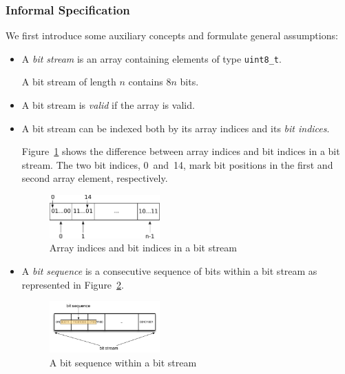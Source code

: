 \subsubsection{Informal Specification}
\label{informal-peek}


We first introduce some auxiliary concepts and formulate general assumptions:

\begin{itemize}
\item
A \emph{bit stream} is an array containing elements of type \verb"uint8_t".

A bit stream of length $n$ contains $8n$ bits.

\item
A bit stream is \emph{valid} if the array is valid.

\item 
A bit stream can be indexed both by its array indices
and its \emph{bit indices}.

Figure~\ref{fig:bitstream-indices} shows the difference between 
array indices and bit indices in a bit stream.
The two bit indices, 0~and~14,
mark bit positions in the first and second array element, respectively.

\begin{figure}[hbt]
\begin{center}
\includegraphics[width=0.40\textwidth]{figures/array_as_stream.pdf}
\caption{\label{fig:bitstream-indices} Array indices and bit indices in a bit stream}
\end{center}
\end{figure}


\item
A \emph{bit sequence} is a consecutive sequence of bits within a bit stream
as represented in Figure~\ref{fig:bitsequence}.
\begin{figure}[hbt]
\begin{center}
\includegraphics[width=0.40\textwidth]{figures/bit_sequence.pdf}
\caption{\label{fig:bitsequence} A bit sequence within a bit stream}
\end{center}
\end{figure}


\end{itemize}
